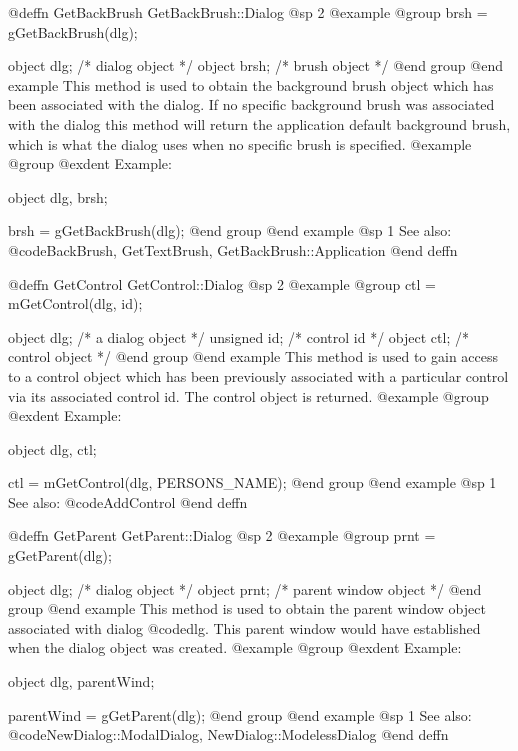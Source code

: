 @deffn {GetBackBrush} GetBackBrush::Dialog
@sp 2
@example
@group
brsh = gGetBackBrush(dlg);

object  dlg;    /*  dialog object  */
object  brsh;   /*  brush object   */
@end group
@end example
This method is used to obtain the background brush object which has been
associated with the dialog.  If no specific background brush was
associated with the dialog this method will return the application
default background brush, which is what the dialog uses when no specific
brush is specified.
@example
@group
@exdent Example:

object  dlg, brsh;

brsh = gGetBackBrush(dlg);
@end group
@end example
@sp 1
See also:  @code{BackBrush, GetTextBrush, GetBackBrush::Application}
@end deffn









@deffn {GetControl} GetControl::Dialog
@sp 2
@example
@group
ctl = mGetControl(dlg, id);

object  dlg;    /*  a dialog object  */
unsigned id;    /*  control id       */
object  ctl;    /*  control object   */
@end group
@end example
This method is used to gain access to a control object which has been
previously associated with a particular control via its associated
control id.  The control object is returned.
@example
@group
@exdent Example:

object  dlg, ctl;

ctl = mGetControl(dlg, PERSONS_NAME);
@end group
@end example
@sp 1
See also:  @code{AddControl}
@end deffn












@deffn {GetParent} GetParent::Dialog
@sp 2
@example
@group
prnt = gGetParent(dlg);

object  dlg;    /*  dialog object         */
object  prnt;   /*  parent window object  */
@end group
@end example
This method is used to obtain the parent window object associated
with dialog @code{dlg}.  This parent window would have established
when the dialog object was created.
@example
@group
@exdent Example:

object  dlg, parentWind;

parentWind = gGetParent(dlg);
@end group
@end example
@sp 1
See also:  @code{NewDialog::ModalDialog, NewDialog::ModelessDialog}
@end deffn
















